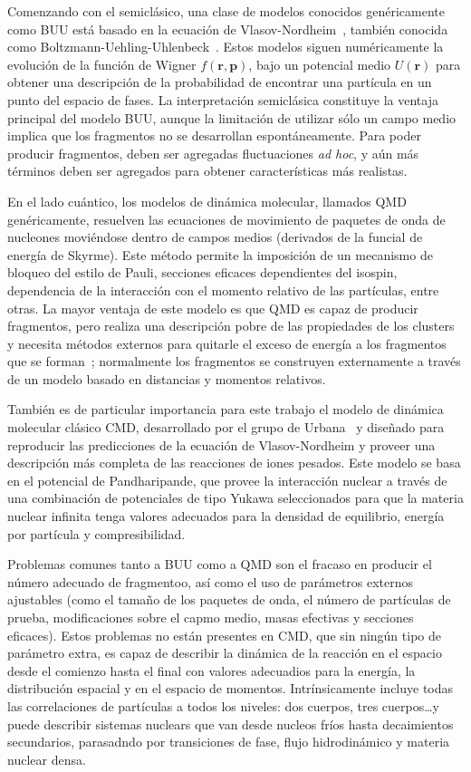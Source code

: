 Comenzando con el semiclásico, una clase de modelos conocidos genéricamente como BUU está basado en la ecuación de Vlasov-Nordheim~\cite{nordheim_kinetic_1928}, también conocida como Boltzmann-Uehling-Uhlenbeck~\cite{uehling_transport_1933}.
Estos modelos siguen numéricamente la evolución de la función de Wigner $f(\mathbf{r},\mathbf{p})$, bajo un potencial medio $U(\mathbf{r})$ para obtener una descripción de la probabilidad de encontrar una partícula en un punto del espacio de fases.
La interpretación semiclásica constituye la ventaja principal del modelo BUU, aunque la limitación de utilizar sólo un campo medio implica que los fragmentos no se desarrollan espontáneamente.
Para poder producir fragmentos, deben ser agregadas fluctuaciones \emph{ad hoc}, y aún más términos deben ser agregados para obtener características más realistas.

En el lado cuántico, los modelos de dinámica molecular, llamados QMD genéricamente, resuelven las ecuaciones de movimiento de paquetes de onda de nucleones moviéndose dentro de campos medios (derivados de la funcial de energía de Skyrme).
Este método permite la imposición de un mecanismo de bloqueo del estilo de Pauli, secciones eficaces dependientes del isospin, dependencia de la interacción con el momento relativo de las partículas, entre otras.
La mayor ventaja de este modelo es que QMD es capaz de producir fragmentos, pero realiza una descripción pobre de las propiedades de los clusters y necesita métodos externos para quitarle el exceso de energía a los fragmentos que se forman~\cite{polanski_development_2005};
normalmente los fragmentos se construyen externamente a través de un modelo basado en distancias y momentos relativos.

También es de particular importancia para este trabajo el modelo de dinámica molecular clásico CMD, desarrollado por el grupo de Urbana~\cite{lenk_accuracy_1990} y diseñado para reproducir las predicciones de la ecuación de Vlasov-Nordheim y  proveer una descripción más completa de las reacciones de iones pesados.
Este modelo se basa en el potencial de Pandharipande, que provee la interacción nuclear a través de una combinación de potenciales de tipo Yukawa seleccionados para que la materia nuclear infinita tenga valores adecuados para la densidad de equilibrio, energía por partícula y compresibilidad.

Problemas comunes tanto a BUU como a QMD son el fracaso en producir el número adecuado de fragmentoo, así como el uso de parámetros externos ajustables (como el tamaño de los paquetes de onda, el número de partículas de prueba, modificaciones sobre el capmo medio, masas efectivas y secciones eficaces).
Estos problemas no están presentes en CMD, que sin ningún tipo de parámetro extra, es capaz de describir la dinámica de la reacción en el espacio desde el comienzo hasta el final con valores adecuadios para la energía, la distribución espacial y en el espacio de momentos.
Intrínsicamente incluye todas las correlaciones de partículas a todos los niveles: dos cuerpos, tres cuerpos\ldots y puede describir sistemas nuclears que van desde nucleos fríos hasta decaimientos secundarios, parasadndo por transiciones de fase, flujo hidrodinámico y materia nuclear densa.

